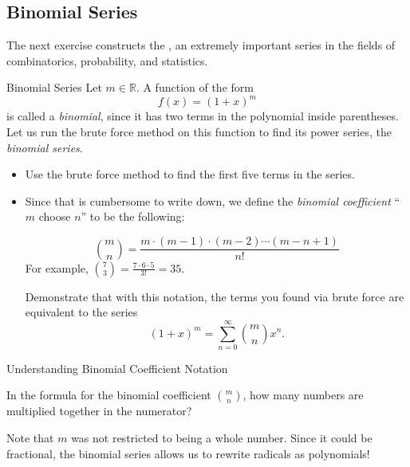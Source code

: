\subsection{Binomial Series}\label{BuyNoMealSeries}

The next exercise constructs the , an extremely important series in the fields of combinatorics, probability, and statistics.

\begin{exercise}{Binomial Series \Coffeecup \Coffeecup \Coffeecup}
Let $m\in\mathbb{R}$.  A function of the form $$f(x)=\left(1+x\right)^m $$ is called a \emph{binomial}, since it has two terms in the polynomial inside parentheses.  Let us run the brute force method on this function to find its power series, the \emph{binomial series}.     

\begin{itemize}
\item Use the brute force method to find the first five terms in the series.  \vspace*{3in}

\item Since that is cumbersome to write down, we define the \emph{binomial coefficient} ``$m$ choose $n$'' to be the following: 

$$\binom{m}{n}=\frac{m\cdot (m-1) \cdot (m-2) \cdots (m-n+1)}{n!} $$ For example, $\binom{7}{3}=\frac{7\cdot 6\cdot 5}{3!}=35$.

Demonstrate that with this notation, the terms you found via brute force are equivalent to the series $$\left( 1+x\right)^m=\sum_{n=0}^\infty\binom{m}{n}x^n. $$ 

\vspace*{2in}

\end{itemize}

\end{exercise}

\newpage

\begin{exercise}{Understanding Binomial Coefficient Notation \Coffeecup}

In the formula for the binomial coefficient $\binom{m}{n}$, how many numbers are multiplied together in the numerator? \vspace*{1in}

\end{exercise}

Note that $m$ was not restricted to being a whole number.  Since it could be fractional, the binomial series allows us to rewrite radicals as polynomials!  

